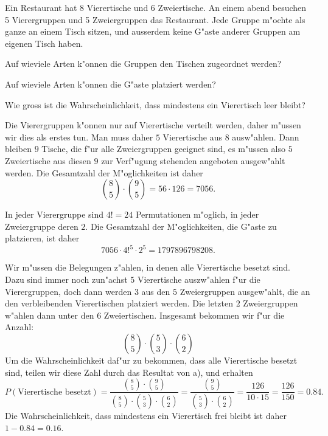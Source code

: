 Ein Restaurant hat 8 Vierertische und 6 Zweiertische.
An einem abend besuchen 5 Vierergruppen und 5 Zweiergruppen das Restaurant.
Jede Gruppe m"ochte als ganze an einem Tisch sitzen, und ausserdem
keine G"aste anderer Gruppen am eigenen Tisch haben.
\begin{teilaufgaben}
\item Auf wieviele Arten k"onnen die Gruppen den Tischen zugeordnet
werden?
\item Auf wieviele Arten k"onnen die G"aste platziert werden?
\item Wie gross ist die Wahrscheinlichkeit, dass mindestens ein Vierertisch
leer bleibt?
\end{teilaufgaben}

\begin{loesung}
\begin{teilaufgaben}
\item
Die Vierergruppen k"onnen nur auf Vierertische verteilt werden,
daher m"ussen wir dies als erstes tun.
Man muss daher $5$ Vierertische aus $8$ ausw"ahlen.
Dann bleiben $9$ Tische, die f"ur alle Zweiergruppen geeignet sind,
es m"ussen also $5$ Zweiertische aus diesen $9$ zur Verf"ugung stehenden
angeboten ausgew"ahlt werden. 
Die Gesamtzahl der M"oglichkeiten ist daher
\[
\binom{8}{5}\cdot\binom{9}{5}=
56\cdot 126=7056.
\]
\item
In jeder Vierergruppe sind $4!=24$ Permutationen m"oglich, in jeder
Zweiergruppe deren $2$.
Die Gesamtzahl der M"oglichkeiten, die G"aste zu platzieren, ist daher
\[
7056\cdot 4!^5 \cdot 2^5=1797896798208.
\]
\item
Wir m"ussen die Belegungen z"ahlen, in denen alle Vierertische
besetzt sind. 
Dazu sind immer noch zun"achst $5$ Vierertische auszw"ahlen f"ur
die Vierergruppen, doch dann werden $3$ aus den $5$ Zweiergruppen ausgew"ahlt,
die an den verbleibenden Vierertischen platziert werden.
Die letzten $2$ Zweiergruppen w"ahlen dann unter den $6$ Zweiertischen.
Insgesamt bekommen wir f"ur die Anzahl:
\[
\binom{8}{5}\cdot \binom{5}{3}\cdot \binom{6}{2}
\]
Um die Wahrscheinlichkeit daf"ur zu bekommen, dass alle Vierertische
besetzt sind, teilen wir diese Zahl durch das Resultat von a), und
erhalten
\[
P(\text{Vierertische besetzt})
=
\frac{\binom{8}{5}\cdot\binom{9}{5}}{
\binom{8}{5}\cdot \binom{5}{3}\cdot \binom{6}{2}}
=
\frac{\binom{9}{5}}{\binom{5}{3}\cdot \binom{6}{2}}
=
\frac{126}{10\cdot 15}=\frac{126}{150}=0.84.
\]
Die Wahrscheinlichkeit, dass mindestens ein Vierertisch frei bleibt ist
daher $1-0.84=0.16$.
\qedhere
\end{teilaufgaben}
\end{loesung}

\begin{bewertung}
\end{bewertung}



